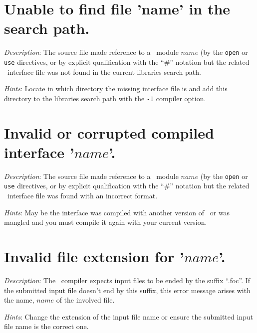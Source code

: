 


\section*{Unable to find file 'name' in the search path.}

{\em Description}: The source file made reference to a \focal\ module
$name$ (by the {\tt open} or {\tt use} directives, or by explicit
qualification with the ``\#'' notation but the related
\focal\ interface file was not found in the current libraries search
path.

{\em Hints}: Locate in which directory the missing interface file is
and add this directory to the libraries search path with the {\tt -I}
compiler option.



\section*{Invalid or corrupted compiled interface '$name$'.}
{\em Description}: The source file made reference to a \focal\ module
$name$ (by the {\tt open} or {\tt use} directives, or by explicit
qualification with the ``\#'' notation but the related
\focal\ interface file was found with an incorrect format.

{\em Hints}: May be the interface was compiled with another version
of \focal\ or was mangled and you must compile it again with your
current version.



\section*{Invalid file extension for '$name$'.}
{\em Description}: The \focal\ compiler expects input files to be
ended by the suffix ``.foc''. If the submitted input file doesn't end
by this suffix, this error message arises with the name, $name$ of the
involved file.

{\em Hints}: Change the extension of the input file name or ensure the
submitted input file name is the correct one.



